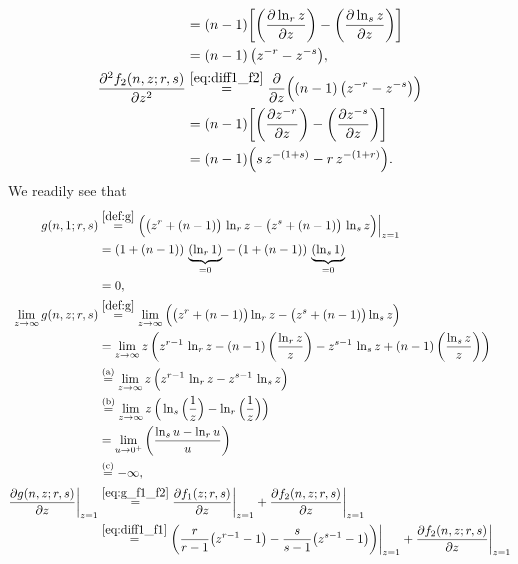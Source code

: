 \documentclass[conference, draftcls, onecolumn]{IEEEtran}
\theoremstyle{plain}
\newcommand{\lemref}[1]{Lemma~\ref{#1}}
\begin{document}
\begin{IEEEproof}[Proof of \lemref{lem:sgn_g}]
\begin{align}
& =
(n-1) \bigg[ \bigg( \frac{ \partial \ln_{r} z }{ \partial z } \bigg) - \bigg( \frac{ \partial \ln_{s} z }{ \partial z } \bigg) \bigg]
\\
& =
(n-1) \, \big( z^{-r} - z^{-s} \big) ,
\label{eq:diff1_f2} \\
\frac{ \partial^{2} f_{2}(n, z; r, s) }{ \partial z^{2} }
& \overset{\eqref{eq:diff1_f2}}{=}
\frac{ \partial }{ \partial z } \Big( (n-1) \, \big( z^{-r} - z^{-s} \big) \Big)
\\
& =
(n-1) \bigg[ \bigg( \frac{ \partial z^{-r} }{ \partial z } \bigg) - \bigg( \frac{ \partial z^{-s} }{ \partial z } \bigg) \bigg]
\\
& =
(n-1) \Big( s \, z^{-(1+s)} - r \, z^{-(1+r)} \Big) .
\label{eq:diff2_f2}
\end{align}
We readily see that
\begin{align}
g(n, 1; r, s)
& \overset{\eqref{def:g}}{=}
\Big( \big( z^{r} + (n-1) \big) \, \ln_{r} z - \big( z^{s} + (n-1) \big) \, \ln_{s} z \Big) \Big|_{z = 1}
\\
& =
(1 + (n-1)) \, \underbrace{ (\ln_{r} 1) }_{ = 0 } \, - \, (1 + (n-1)) \, \underbrace{ (\ln_{s} 1) }_{ = 0 }
\\
& =
0 ,
\label{eq:g_z1} \\
\lim_{z \to \infty} g(n, z; r, s)
& \overset{\eqref{def:g}}{=}
\lim_{z \to \infty} \Big( \big( z^{r} + (n-1) \big) \ln_{r} z - \big( z^{s} + (n-1) \big) \ln_{s} z \Big)
\\
& =
\lim_{z \to \infty} z \, \bigg( z^{r-1} \, \ln_{r} z - (n-1) \, \bigg( \frac{ \ln_{r} z }{ z } \bigg) - z^{s-1} \, \ln_{s} z + (n-1) \, \bigg( \frac{ \ln_{s} z }{ z } \bigg) \bigg)
\\
& \overset{\text{(a)}}{=}
\lim_{z \to \infty} z \, \Big( z^{r-1} \, \ln_{r} z - z^{s-1} \, \ln_{s} z \Big)
\\
& \overset{\text{(b)}}{=}
\lim_{z \to \infty} z \, \Big( \ln_{s} \Big( \frac{1}{z} \Big) - \ln_{r} \Big( \frac{1}{z} \Big) \Big)
\\
& =
\lim_{u \to 0^{+}} \bigg( \frac{ \ln_{s} u - \ln_{r} u }{ u } \bigg)
\\
& \overset{\text{(c)}}{=}
- \infty ,
\label{eq:lim_g_z_infty}
\\
\frac{ \partial g(n, z; r, s) }{ \partial z } \bigg|_{z = 1}
& \overset{\eqref{eq:g_f1_f2}}{=}
\frac{ \partial f_{1}(z; r, s) }{ \partial z } \bigg|_{z = 1} + \frac{ \partial f_{2}(n, z; r, s) }{ \partial z } \bigg|_{z = 1}
\\
& \overset{\eqref{eq:diff1_f1}}{=}
\bigg( \frac{ r }{ r-1 } \big( z^{r-1} - 1 \big) - \frac{ s }{ s-1 } \big( z^{s-1} - 1 \big) \bigg) \bigg|_{z = 1} + \frac{ \partial f_{2}(n, z; r, s) }{ \partial z } \bigg|_{z = 1}

\end{align}
\end{IEEEproof}
\end{document}
